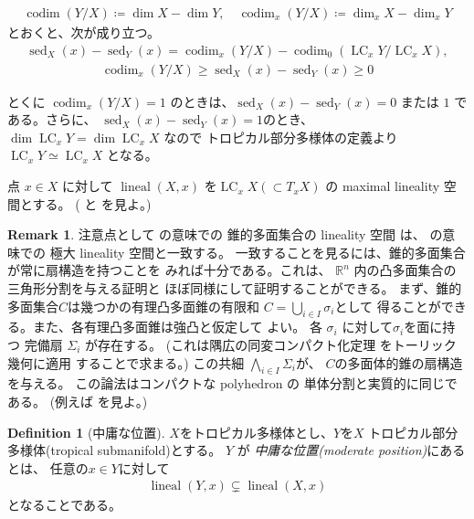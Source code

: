 \documentclass[a4paper,dvipdfmx,reqno,12pt]{amsart}
\theoremstyle{definition}
\newtheorem{definition}[theorem]{Definition}
\newtheorem{remark}[theorem]{Remark}
\newcommand{\deq}{\coloneqq}
\newcommand{\opn}[1]{\operatorname{#1}}
\numberwithin{equation}{section}
\begin{document}
\begin{align}
\opn{codim}(Y/X)\deq \dim X -\dim Y,\quad 
\opn{codim}_x(Y/X)\deq \dim_x X -\dim_x Y
\end{align}
とおくと、次が成り立つ。
\begin{align}
\opn{sed}_X(x)-\opn{sed}_Y(x)=
\opn{codim}_x(Y/X)-\opn{codim}_0(\opn{LC}_x Y/\opn{LC}_xX),
\end{align}
\begin{align}
\opn{codim}_x(Y/X) \geq 
\opn{sed}_X(x)-\opn{sed}_Y(x)\geq 0
\end{align}

とくに $\opn{codim}_x(Y/X)=1$
のときは、$\opn{sed}_X(x)-\opn{sed}_Y(x)=0$ または
$1$ である。さらに、
$\opn{sed}_X(x)-\opn{sed}_Y(x)=1$のとき、
$\dim \opn{LC}_x Y=\dim \opn{LC}_x X$
なので トロピカル部分多様体の定義より
$\opn{LC}_x Y\simeq \opn{LC}_x X$
となる。

点 $x\in X$ に対して
$\opn{lineal}(X,x)$ を$\opn{LC}_x X (\subset T_x X)$
の maximal lineality 空間とする。
(\cite[]{MR4246795} と
\cite[]{demedrano2023chern} を見よ。)



\begin{remark}
注意点として
\cite[]{MR3041763}の意味での
錐的多面集合の lineality 空間
は、
\cite[]{MR4246795}の意味での
極大 lineality 空間と一致する。
一致することを見るには、錐的多面集合が常に扇構造を持つことを
みれば十分である。これは、
$\mathbb{R}^{n}$ 内の凸多面集合の三角形分割を与える証明と
ほぼ同様にして証明することができる。
まず、錐的多面集合$C$は幾つかの有理凸多面錐の有限和
$C=\bigcup_{i\in I}\sigma_i$として
得ることができる。また、各有理凸多面錐は強凸と仮定して
よい。
各 $\sigma_i$ に対して$\sigma_i$を面に持つ
完備扇 $\Sigma_i$ が存在する。
(これは隅広の同変コンパクト化定理
\cite[Theorem 3]{MR337963}をトーリック幾何に適用
することで求まる。)
この共細 $\bigwedge_{i\in I}\Sigma_i$が、
$C$の多面体的錐の扇構造を与える。
この論法はコンパクトな polyhedron の
単体分割と実質的に同じである。
(例えば\cite[Theorem 2.11]{MR665919}
を見よ。)
\end{remark}

\begin{definition}[{中庸な位置}]
\label{definition-permissible-position}
$X$をトロピカル多様体とし、$Y$を$X$
トロピカル部分多様体(tropical submanifold)とする。
$Y$ が \emph{中庸な位置(moderate position)}にあるとは、
任意の$x\in Y$に対して
\begin{align}
     \opn{lineal}(Y,x) \subsetneq
 \opn{lineal}(X,x)
\end{align}
となることである。
\end{definition}
\end{document}
